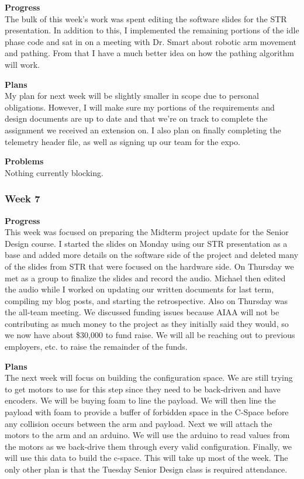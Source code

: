 \textbf{Progress} \\
The bulk of this week's work was spent editing the software slides for the STR
presentation. In addition to this, I implemented the remaining portions of the
idle phase code and sat in on a meeting with Dr. Smart about robotic arm 
movement and pathing. From that I have a much better idea on how the pathing 
algorithm will work.

\textbf{Plans} \\
My plan for next week will be slightly smaller in scope due to personal 
obligations. However, I will make sure my portions of the requirements and 
design documents are up to date and that we're on track to complete the 
assignment we received an extension on. I also plan on finally completing the 
telemetry header file, as well as signing up our team for the expo.

\textbf{Problems} \\
Nothing currently blocking.

\subsubsection{Week 7}
\textbf{Progress} \\ 
This week was focused on preparing the Midterm project update for the Senior Design course. I started the slides on Monday using our STR presentation as a base and added more details on the software side of the project and deleted many of the slides from STR that were focused on the hardware side. On Thursday we met as a group to finalize the slides and record the audio. Michael then edited the audio while I worked on updating our written documents for last term, compiling my blog posts, and starting the retrospective. Also on Thursday was the all-team meeting. We discussed funding issues because AIAA will not be contributing as much money to the project as they initially said they would, so we now have about \$30,000 to fund raise. We will all be reaching out to previous employers, etc. to raise the remainder of the funds.

\textbf{Plans} \\ 
The next week will focus on building the configuration space. We are still trying to get motors to use for this step since they need to be back-driven and have encoders. We will be buying foam to line the payload. We will then line the payload with foam to provide a buffer of forbidden space in the C-Space before any collision occurs between the arm and payload. Next we will attach the motors to the arm and an arduino. We will use the arduino to read values from the motors as we back-drive them through every valid configuration. Finally, we will use this data to build the c-space. This will take up most of the week. The only other plan is that the Tuesday Senior Design class is required attendance.


